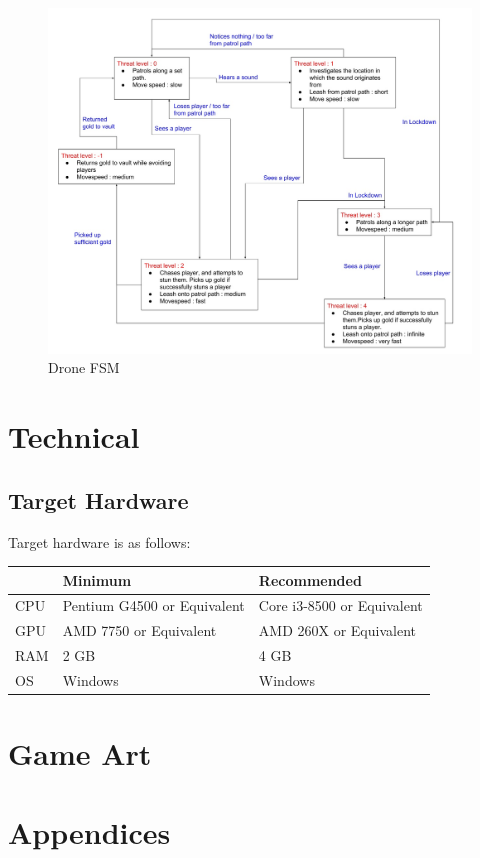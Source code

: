 \documentclass[14pt]{report}
\begin{document}
\begin{figure}[h!]
	\includegraphics[width=\linewidth]{images/fsm-ai.jpg}
	\caption{Drone FSM}
\end{figure}

\chapter{Technical}

\section{Target Hardware}

Target hardware is as follows:

\begin{tabular}{|l|l|l|}
    \hline
     & Minimum & Recommended \\ \hline
     CPU & Pentium G4500 or Equivalent & Core i3-8500 or Equivalent \\ \hline
     GPU & AMD 7750 or Equivalent & AMD 260X or Equivalent \\ \hline
     RAM & 2 GB & 4 GB \\ \hline
     OS & Windows & Windows \\
    \hline
\end{tabular}

\chapter{Game Art}

\chapter{Appendices}
\end{document}
